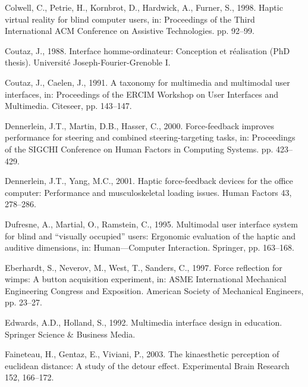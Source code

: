 \documentclass[
]{book}
\newlength{\cslhangindent}
\newlength{\cslentryspacingunit} %
\newenvironment{CSLReferences}[2] %
 {%
  \setlength{\parindent}{0pt}
  \ifodd #1
  \let\oldpar\par
  \def\par{\hangindent=\cslhangindent\oldpar}
  \fi
  \setlength{\parskip}{#2\cslentryspacingunit}
 }%
 {}
\begin{document}
\begin{CSLReferences}{1}{0}
\leavevmode{}%
Colwell, C., Petrie, H., Kornbrot, D., Hardwick, A., Furner, S., 1998. Haptic virtual reality for blind computer users, in: Proceedings of the Third International ACM Conference on Assistive Technologies. pp. 92--99.

\leavevmode{}%
Coutaz, J., 1988. Interface homme-ordinateur: Conception et r{é}alisation (PhD thesis). Universit{é} Joseph-Fourier-Grenoble I.

\leavevmode{}%
Coutaz, J., Caelen, J., 1991. A taxonomy for multimedia and multimodal user interfaces, in: Proceedings of the ERCIM Workshop on User Interfaces and Multimedia. Citeseer, pp. 143--147.

\leavevmode{}%
Dennerlein, J.T., Martin, D.B., Hasser, C., 2000. Force-feedback improves performance for steering and combined steering-targeting tasks, in: Proceedings of the SIGCHI Conference on Human Factors in Computing Systems. pp. 423--429.

\leavevmode{}%
Dennerlein, J.T., Yang, M.C., 2001. Haptic force-feedback devices for the office computer: Performance and musculoskeletal loading issues. Human Factors 43, 278--286.

\leavevmode{}%
Dufresne, A., Martial, O., Ramstein, C., 1995. Multimodal user interface system for blind and {``visually occupied''} users: Ergonomic evaluation of the haptic and auditive dimensions, in: Human---Computer Interaction. Springer, pp. 163--168.

\leavevmode{}%
Eberhardt, S., Neverov, M., West, T., Sanders, C., 1997. Force reflection for wimps: A button acquisition experiment, in: ASME International Mechanical Engineering Congress and Exposition. American Society of Mechanical Engineers, pp. 23--27.

\leavevmode{}%
Edwards, A.D., Holland, S., 1992. Multimedia interface design in education. Springer Science \& Business Media.

\leavevmode{}%
Faineteau, H., Gentaz, E., Viviani, P., 2003. The kinaesthetic perception of euclidean distance: A study of the detour effect. Experimental Brain Research 152, 166--172.


\end{CSLReferences}
\end{document}
